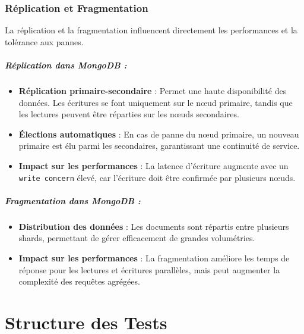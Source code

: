 \documentclass[12pt,a4paper]{report}
\begin{document}
    \subsection{Réplication et Fragmentation}
        \begin{card}
            La réplication et la fragmentation influencent directement les performances et la tolérance aux pannes.
        
            \paragraph{Réplication dans MongoDB :}
            \begin{itemize}
                \item \textbf{Réplication primaire-secondaire} : Permet une haute disponibilité des données. Les écritures se font uniquement sur le nœud primaire, tandis que les lectures peuvent être réparties sur les nœuds secondaires.
                \item \textbf{Élections automatiques} : En cas de panne du nœud primaire, un nouveau primaire est élu parmi les secondaires, garantissant une continuité de service.
                \item \textbf{Impact sur les performances} : La latence d'écriture augmente avec un \texttt{write concern} élevé, car l'écriture doit être confirmée par plusieurs nœuds.
            \end{itemize}

            \paragraph{Fragmentation dans MongoDB :}

            \begin{itemize}
                \item \textbf{Distribution des données} : Les documents sont répartis entre plusieurs shards, permettant de gérer efficacement de grandes volumétries.
                \item \textbf{Impact sur les performances} : La fragmentation améliore les temps de réponse pour les lectures et écritures parallèles, mais peut augmenter la complexité des requêtes agrégées.
            \end{itemize}
        \end{card}



\chapter{Structure des Tests}
\end{document}
